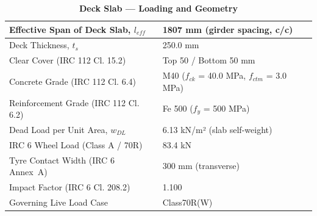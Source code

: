 \documentclass[12pt,a4paper]{report}
\numberwithin{table}{chapter}
\numberwithin{figure}{chapter}
\begin{document}
\vspace{1em}
\begin{longtable}{|L{5.5cm}|p{10.0cm}|}
\caption{\textbf{Deck Slab --- Loading and Geometry}}
\hline
\textnormal{Effective Span of Deck Slab, $l_{eff}$} & 1807 mm (girder spacing, c/c) \\[6pt]
\hline
\textnormal{Deck Thickness, $t_s$} & 250.0 mm \\[6pt]
\hline
\textnormal{Clear Cover (IRC 112 Cl. 15.2)} & Top 50 / Bottom 50 mm \\[6pt]
\hline
\textnormal{Concrete Grade (IRC 112 Cl. 6.4)} & M40 ($f_{ck}$ = 40.0 MPa, $f_{ctm}$ = 3.0 MPa) \\[6pt]
\hline
\textnormal{Reinforcement Grade (IRC 112 Cl. 6.2)} & Fe 500 ($f_y$ = 500 MPa) \\[6pt]
\hline
\textnormal{Dead Load per Unit Area, $w_{DL}$} & 6.13 kN/m² (slab self-weight) \\[6pt]
\hline
\textnormal{IRC 6 Wheel Load (Class A / 70R)} & 83.4 kN \\[6pt]
\hline
\textnormal{Tyre Contact Width (IRC 6 Annex~A)} & 300 mm (transverse) \\[6pt]
\hline
\textnormal{Impact Factor (IRC 6 Cl. 208.2)} & 1.100 \\[6pt]
\hline
\textnormal{Governing Live Load Case} & Class70R(W) \\[6pt]
\hline
\end{longtable}
\end{document}
